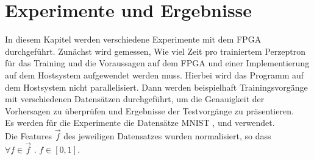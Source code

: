 \chapter{Experimente und Ergebnisse}
In diesem Kapitel werden verschiedene Experimente mit dem FPGA durchgeführt. Zunächst wird gemessen, Wie viel Zeit pro trainiertem Perzeptron für das Training und die Voraussagen auf dem FPGA und einer Implementierung auf dem Hostsystem aufgewendet werden muss. Hierbei wird das Programm auf dem Hostsystem nicht parallelisiert. 
Dann werden beispielhaft Trainingsvorgänge mit verschiedenen Datensätzen durchgeführt, um die Genauigkeit der Vorhersagen zu überprüfen und Ergebnisse der Testvorgänge zu präsentieren.\\
Es werden für die Experimente die Datensätze MNIST \cite{MNIST}, und verwendet.\\
Die Features $\vec f$ des jeweiligen Datensatzes wurden normalisiert, so dass $\forall f \in \vec f\text{ . } f \in [0,1]$. 
